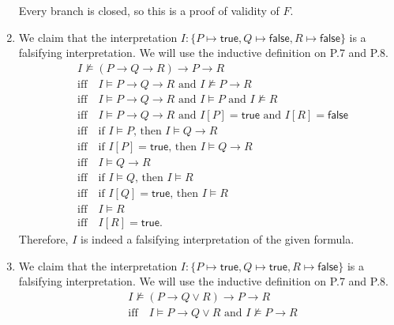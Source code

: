\begin{exer}[1.1]
\begin{enumerate}[label=(\alph*)]
            Every branch is closed, so this is a proof of validity of $F$.
        \item
            We claim that the interpretation $I: \{ P \mapsto \textsf{true}, Q \mapsto \textsf{false}, R \mapsto \textsf{false} \}$ is a falsifying interpretation.
            We will use the inductive definition on P.7 and P.8.
            \begin{align*}
                &I \not\models (P \rightarrow Q \rightarrow R) \rightarrow P \rightarrow R \\
                    &\text{iff}\quad I \models P \rightarrow Q \rightarrow R \text{ and } I \not\models P \rightarrow R \\
                    &\text{iff}\quad I \models P \rightarrow Q \rightarrow R \text{ and } I \models P \text{ and } I \not\models R \\
                    &\text{iff}\quad I \models P \rightarrow Q \rightarrow R \text{ and } I[P] = \textsf{true} \text{ and } I[R] = \textsf{false} \\
                    &\text{iff}\quad \text{if } I \models P \text{, then } I \models Q \rightarrow R \\
                    &\text{iff}\quad \text{if } I[P] = \textsf{true} \text{, then } I \models Q \rightarrow R \\
                    &\text{iff}\quad I \models Q \rightarrow R \\
                    &\text{iff}\quad \text{if } I \models Q \text{, then } I \models R \\
                    &\text{iff}\quad \text{if } I[Q] = \textsf{true} \text{, then } I \models R \\
                    &\text{iff}\quad I \models R \\
                    &\text{iff}\quad I[R] = \textsf{true}.
            \end{align*}
            Therefore, $I$ is indeed a falsifying interpretation of the given formula.
        \item
            We claim that the interpretation $I: \{ P \mapsto \textsf{true}, Q \mapsto \textsf{true}, R \mapsto \textsf{false} \}$ is a falsifying interpretation.
            We will use the inductive definition on P.7 and P.8.
            \begin{align*}
                &I \not\models (P \rightarrow Q \lor R) \rightarrow P \rightarrow R \\
                    &\text{iff}\quad I \models P \rightarrow Q \lor R \text{ and } I \not\models P \rightarrow R \\

\end{align*}
\end{enumerate}
\end{exer}

